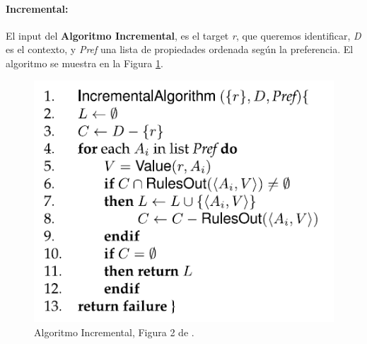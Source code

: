 \paragraph{Incremental:}
\label{sec:algo_incremental} 

El input del {\bf Algoritmo Incremental}, es el target \emph{r}, que queremos identificar, \emph{D} es el contexto, y \emph{Pref} una lista de propiedades ordenada seg\'un la preferencia. El algoritmo se muestra en la Figura \ref{algoritmoIncremental}.
\medskip
\begin{figure}[H]
\includegraphics[width=.5\textwidth]{images/algoritmoIncremental.png}
\caption{Algoritmo Incremental, Figura 2 de \protect\cite{survey}.}\label{algoritmoIncremental}

\end{figure}

